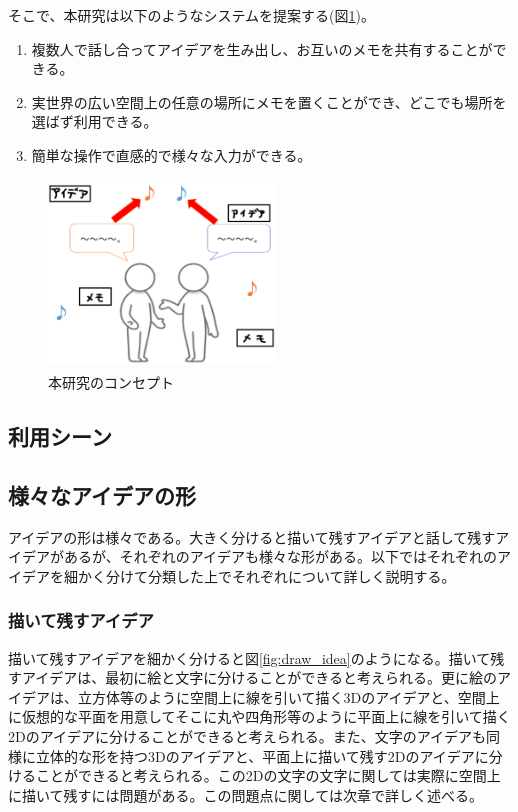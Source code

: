 \documentclass[11pt,a4j, titlepage]{jarticle} %
\begin{document}
そこで、本研究は以下のようなシステムを提案する(図\ref{fig:concept})。

\begin{enumerate}[(1)]
 \item 複数人で話し合ってアイデアを生み出し、お互いのメモを共有することができる。
 \item 実世界の広い空間上の任意の場所にメモを置くことができ、どこでも場所を選ばず利用できる。
 \item 簡単な操作で直感的で様々な入力ができる。
\end{enumerate}

\begin{figure}[H]
  \begin{center}
    \includegraphics[clip,height=5.0cm,width=6.0cm]{./concept.eps}
    \caption{本研究のコンセプト}
    \label{fig:concept}
  \end{center}
\end{figure}

\subsection{利用シーン}

\subsection{様々なアイデアの形}
アイデアの形は様々である。大きく分けると描いて残すアイデアと話して残すアイデアがあるが、それぞれのアイデアも様々な形がある。以下ではそれぞれのアイデアを細かく分けて分類した上でそれぞれについて詳しく説明する。

\subsubsection{描いて残すアイデア} \label{draw_idea}
描いて残すアイデアを細かく分けると図\ref{fig:draw_idea}のようになる。描いて残すアイデアは、最初に絵と文字に分けることができると考えられる。更に絵のアイデアは、立方体等のように空間上に線を引いて描く3Dのアイデアと、空間上に仮想的な平面を用意してそこに丸や四角形等のように平面上に線を引いて描く2Dのアイデアに分けることができると考えられる。また、文字のアイデアも同様に立体的な形を持つ3Dのアイデアと、平面上に描いて残す2Dのアイデアに分けることができると考えられる。この2Dの文字の文字に関しては実際に空間上に描いて残すには問題がある。この問題点に関しては次章で詳しく述べる。
\end{document}
